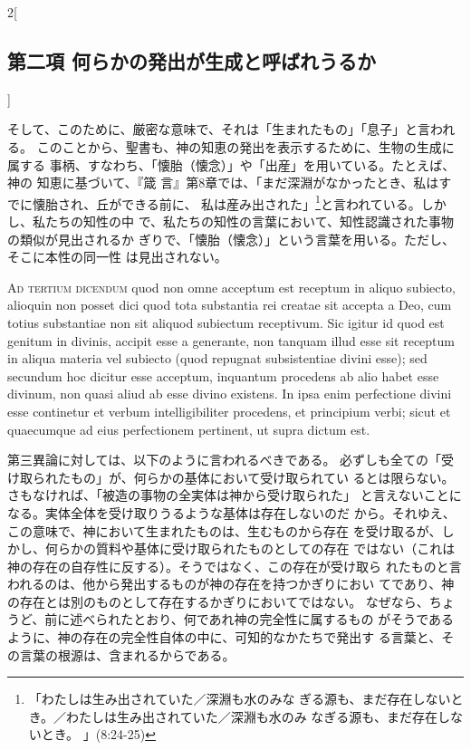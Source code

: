 \documentclass[paper=a4paper,fontsize=10pt,jafontsize=9pt,titlepage]{jlreq}
\begin{document}
\begin{paracol}{2}[\subsection{第二項 何らかの発出が生成と呼ばれうるか}]
\switchcolumn


そして、このために、厳密な意味で、それは「生まれたもの」「息子」と言われる。
このことから、聖書も、神の知恵の発出を表示するために、生物の生成に属する
 事柄、すなわち、「懐胎（懐念）」や「出産」を用いている。たとえば、神の
 知恵に基づいて、『箴
 言』第8章では、「まだ深淵がなかったとき、私はすでに懐胎され、丘ができる前に、
 私は産み出された」\footnote{「わたしは生み出されていた／深淵も水のみな
 ぎる源も、まだ存在しないとき。／わたしは生み出されていた／深淵も水のみ
 なぎる源も、まだ存在しないとき。 」(8:24-25)}と言われている。しかし、私たちの知性の中
 で、私たちの知性の言葉において、知性認識された事物の類似が見出されるか
 ぎりで、「懐胎（懐念）」という言葉を用いる。ただし、そこに本性の同一性
 は見出されない。


\switchcolumn*[\subsection{ad.3}]


{\scshape Ad tertium dicendum} quod non omne acceptum est receptum in aliquo
subiecto, alioquin non posset dici quod tota substantia rei creatae sit
accepta a Deo, cum totius substantiae non sit aliquod subiectum
receptivum. Sic igitur id quod est genitum in divinis, accipit esse a
generante, non tanquam illud esse sit receptum in aliqua materia vel
subiecto (quod repugnat subsistentiae divini esse); sed secundum hoc
dicitur esse acceptum, inquantum procedens ab alio habet esse divinum,
non quasi aliud ab esse divino existens. In ipsa enim perfectione divini
esse continetur et verbum intelligibiliter procedens, et principium
verbi; sicut et quaecumque ad eius perfectionem pertinent, ut supra
dictum est.


\switchcolumn


第三異論に対しては、以下のように言われるべきである。
必ずしも全ての「受け取られたもの」が、何らかの基体において受け取られてい
 るとは限らない。さもなければ、「被造の事物の全実体は神から受け取られた」
 と言えないことになる。実体全体を受け取りうるような基体は存在しないのだ
 から。それゆえ、この意味で、神において生まれたものは、生むものから存在
 を受け取るが、しかし、何らかの質料や基体に受け取られたものとしての存在
 ではない（これは神の存在の自存性に反する）。そうではなく、この存在が受け取ら
 れたものと言われるのは、他から発出するものが神の存在を持つかぎりにおい
 てであり、神の存在とは別のものとして存在するかぎりにおいてではない。
なぜなら、ちょうど、前に述べられたとおり、何であれ神の完全性に属するもの
 がそうであるように、神の存在の完全性自体の中に、可知的なかたちで発出す
 る言葉と、その言葉の根源は、含まれるからである。


\switchcolumn*



\end{paracol}
\newpage
\end{document}
